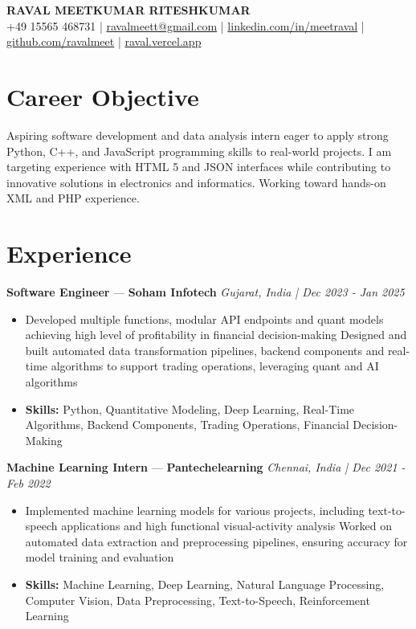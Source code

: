 \documentclass[a4paper,10pt]{article}
\begin{document}
\begin{center}
  {\Large\bfseries RAVAL MEETKUMAR RITESHKUMAR}\\[2pt]
  {\small +49 15565 468731 \;|\; \href{mailto:ravalmeett@gmail.com}{ravalmeett@gmail.com} \;|\; \href{https://www.linkedin.com/in/meetraval/}{linkedin.com/in/meetraval} \;|\; \href{https://github.com/ravalmeet}{github.com/ravalmeet} \;|\; \href{https://raval.vercel.app/}{raval.vercel.app}}
\end{center}
\vspace{-3pt}

\section*{Career Objective}
Aspiring software development and data analysis intern eager to apply strong Python, C++, and JavaScript programming skills to real-world projects. I am targeting experience with HTML 5 and JSON interfaces while contributing to innovative solutions in electronics and informatics. Working toward hands-on XML and PHP experience.\par

\section*{Experience}
\textbf{Software Engineer} — \textbf{Soham Infotech} \hfill \textit{Gujarat, India \;|\; Dec 2023 - Jan 2025}\par
\vspace{1pt}
\begin{itemize}
  \item Developed multiple functions, modular API endpoints and quant models achieving high level of profitability in financial decision-making Designed and built automated data transformation pipelines, backend components and real-time algorithms to support trading operations, leveraging quant and AI algorithms
  \item \textbf{Skills:} Python, Quantitative Modeling, Deep Learning, Real-Time Algorithms, Backend Components, Trading Operations, Financial Decision-Making
\end{itemize}
\vspace{3pt}
\textbf{Machine Learning Intern} — \textbf{Pantechelearning} \hfill \textit{Chennai, India \;|\; Dec 2021 - Feb 2022}\par
\vspace{1pt}
\begin{itemize}
  \item Implemented machine learning models for various projects, including text-to-speech applications and high functional visual-activity analysis Worked on automated data extraction and preprocessing pipelines, ensuring accuracy for model training and evaluation
  \item \textbf{Skills:} Machine Learning, Deep Learning, Natural Language Processing, Computer Vision, Data Preprocessing, Text-to-Speech, Reinforcement Learning
\end{itemize}
\end{document}
